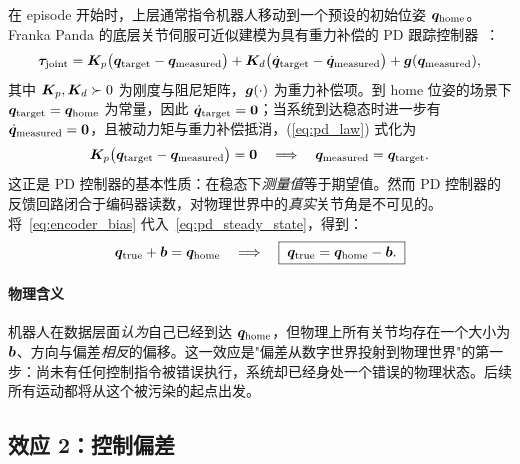 在 episode 开始时，上层通常指令机器人移动到一个预设的初始位姿 $\bm{q}_{\text{home}}$。Franka Panda 的底层关节伺服可近似建模为具有重力补偿的 PD 跟踪控制器~\cite{siciliano2010robotics}：
\begin{equation}
  \bm{\tau}_{\text{joint}} = \bm{K}_p \big(\bm{q}_{\text{target}} - \bm{q}_{\text{measured}}\big)
  + \bm{K}_d \big(\dot{\bm{q}}_{\text{target}} - \dot{\bm{q}}_{\text{measured}}\big)
  + \bm{g}(\bm{q}_{\text{measured}}),
  \label{eq:pd_law}
\end{equation}
其中 $\bm{K}_p, \bm{K}_d \succ 0$ 为刚度与阻尼矩阵，$\bm{g}(\cdot)$ 为重力补偿项。到 home 位姿的场景下 $\bm{q}_{\text{target}} = \bm{q}_{\text{home}}$ 为常量，因此 $\dot{\bm{q}}_{\text{target}} = \bm{0}$；当系统到达稳态时进一步有 $\dot{\bm{q}}_{\text{measured}} = \bm{0}$，且被动力矩与重力补偿抵消，(\ref{eq:pd_law}) 式化为
\begin{equation}
  \bm{K}_p \big(\bm{q}_{\text{target}} - \bm{q}_{\text{measured}}\big) = \bm{0}
  \quad\Longrightarrow\quad
  \bm{q}_{\text{measured}} = \bm{q}_{\text{target}}.
  \label{eq:pd_steady_state}
\end{equation}
这正是 PD 控制器的基本性质：在稳态下\emph{测量值}等于期望值。然而 PD 控制器的反馈回路闭合于编码器读数，对物理世界中的\emph{真实}关节角是不可见的。将~\cref{eq:encoder_bias} 代入~\cref{eq:pd_steady_state}，得到：
\begin{equation}
  \bm{q}_{\text{true}} + \bm{b} = \bm{q}_{\text{home}}
  \quad\Longrightarrow\quad
  \boxed{\;\bm{q}_{\text{true}} = \bm{q}_{\text{home}} - \bm{b}.\;}
  \label{eq:effect1}
\end{equation}

\paragraph{物理含义} 机器人在数据层面\emph{认为}自己已经到达 $\bm{q}_{\text{home}}$，但物理上所有关节均存在一个大小为 $\bm{b}$、方向与偏差\emph{相反}的偏移。这一效应是"偏差从数字世界投射到物理世界"的第一步：尚未有任何控制指令被错误执行，系统却已经身处一个错误的物理状态。后续所有运动都将从这个被污染的起点出发。

\subsection{效应 2：控制偏差}\label{subsec:effect2}

